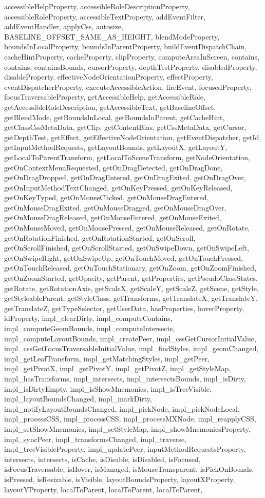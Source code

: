 {{{{{{{{{{{{{{accessibleHelpProperty, accessibleRoleDescriptionProperty, accessibleRoleProperty, accessibleTextProperty, addEventFilter, addEventHandler, applyCss, autosize, BASELINE\_OFFSET\_SAME\_AS\_HEIGHT, blendModeProperty, boundsInLocalProperty, boundsInParentProperty, buildEventDispatchChain, cacheHintProperty, cacheProperty, clipProperty, computeAreaInScreen, contains, contains, containsBounds, cursorProperty, depthTestProperty, disabledProperty, disableProperty, effectiveNodeOrientationProperty, effectProperty, eventDispatcherProperty, executeAccessibleAction, fireEvent, focusedProperty, focusTraversableProperty, getAccessibleHelp, getAccessibleRole, getAccessibleRoleDescription, getAccessibleText, getBaselineOffset, getBlendMode, getBoundsInLocal, getBoundsInParent, getCacheHint, getClassCssMetaData, getClip, getContentBias, getCssMetaData, getCursor, getDepthTest, getEffect, getEffectiveNodeOrientation, getEventDispatcher, getId, getInputMethodRequests, getLayoutBounds, getLayoutX, getLayoutY, getLocalToParentTransform, getLocalToSceneTransform, getNodeOrientation, getOnContextMenuRequested, getOnDragDetected, getOnDragDone, getOnDragDropped, getOnDragEntered, getOnDragExited, getOnDragOver, getOnInputMethodTextChanged, getOnKeyPressed, getOnKeyReleased, getOnKeyTyped, getOnMouseClicked, getOnMouseDragEntered, getOnMouseDragExited, getOnMouseDragged, getOnMouseDragOver, getOnMouseDragReleased, getOnMouseEntered, getOnMouseExited, getOnMouseMoved, getOnMousePressed, getOnMouseReleased, getOnRotate, getOnRotationFinished, getOnRotationStarted, getOnScroll, getOnScrollFinished, getOnScrollStarted, getOnSwipeDown, getOnSwipeLeft, getOnSwipeRight, getOnSwipeUp, getOnTouchMoved, getOnTouchPressed, getOnTouchReleased, getOnTouchStationary, getOnZoom, getOnZoomFinished, getOnZoomStarted, getOpacity, getParent, getProperties, getPseudoClassStates, getRotate, getRotationAxis, getScaleX, getScaleY, getScaleZ, getScene, getStyle, getStyleableParent, getStyleClass, getTransforms, getTranslateX, getTranslateY, getTranslateZ, getTypeSelector, getUserData, hasProperties, hoverProperty, idProperty, impl\_clearDirty, impl\_computeContains, impl\_computeGeomBounds, impl\_computeIntersects, impl\_computeLayoutBounds, impl\_createPeer, impl\_cssGetCursorInitialValue, impl\_cssGetFocusTraversableInitialValue, impl\_findStyles, impl\_geomChanged, impl\_getLeafTransform, impl\_getMatchingStyles, impl\_getPeer, impl\_getPivotX, impl\_getPivotY, impl\_getPivotZ, impl\_getStyleMap, impl\_hasTransforms, impl\_intersects, impl\_intersectsBounds, impl\_isDirty, impl\_isDirtyEmpty, impl\_isShowMnemonics, impl\_isTreeVisible, impl\_layoutBoundsChanged, impl\_markDirty, impl\_notifyLayoutBoundsChanged, impl\_pickNode, impl\_pickNodeLocal, impl\_processCSS, impl\_processCSS, impl\_processMXNode, impl\_reapplyCSS, impl\_setShowMnemonics, impl\_setStyleMap, impl\_showMnemonicsProperty, impl\_syncPeer, impl\_transformsChanged, impl\_traverse, impl\_treeVisibleProperty, impl\_updatePeer, inputMethodRequestsProperty, intersects, intersects, isCache, isDisable, isDisabled, isFocused, isFocusTraversable, isHover, isManaged, isMouseTransparent, isPickOnBounds, isPressed, isResizable, isVisible, layoutBoundsProperty, layoutXProperty, layoutYProperty, localToParent, localToParent, localToParent, }}}}}}}}}}}}}}
